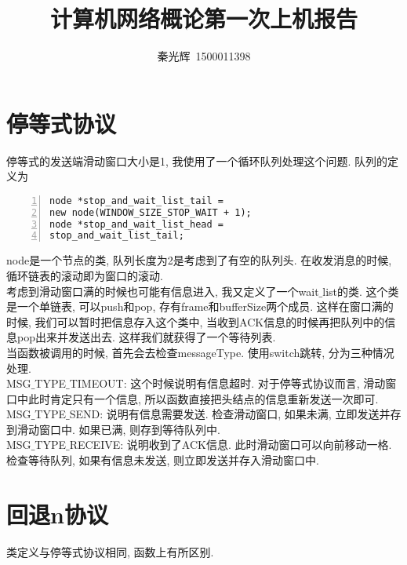 \documentclass[a4paper,12pt,notitlepage]{article}
\begin{document}
\title{计算机网络概论第一次上机报告}
\author{秦光辉\ 1500011398}
\maketitle

\section{停等式协议}

	停等式的发送端滑动窗口大小是1, 我使用了一个循环队列处理这个问题. 队列的定义为
	
\begin{lstlisting}[frame=shadowbox,numbers=left]
node *stop_and_wait_list_tail = 
new node(WINDOW_SIZE_STOP_WAIT + 1);
node *stop_and_wait_list_head = 
stop_and_wait_list_tail;
\end{lstlisting}

	node是一个节点的类, 队列长度为2是考虑到了有空的队列头. 在收发消息的时候, 循环链表的滚动即为窗口的滚动. \\
	
	考虑到滑动窗口满的时候也可能有信息进入, 我又定义了一个wait$\_$list的类. 这个类是一个单链表, 可以push和pop, 存有frame和bufferSize两个成员. 这样在窗口满的时候, 我们可以暂时把信息存入这个类中, 当收到ACK信息的时候再把队列中的信息pop出来并发送出去. 这样我们就获得了一个等待列表. \\
	
	当函数被调用的时候, 首先会去检查messageType. 使用switch跳转, 分为三种情况处理. \\
	
	MSG$\_$TYPE$\_$TIMEOUT: 这个时候说明有信息超时. 对于停等式协议而言, 滑动窗口中此时肯定只有一个信息, 所以函数直接把头结点的信息重新发送一次即可. \\
	
	MSG$\_$TYPE$\_$SEND: 说明有信息需要发送. 检查滑动窗口, 如果未满, 立即发送并存到滑动窗口中. 如果已满, 则存到等待队列中. \\
	
	MSG$\_$TYPE$\_$RECEIVE: 说明收到了ACK信息. 此时滑动窗口可以向前移动一格. 检查等待队列, 如果有信息未发送, 则立即发送并存入滑动窗口中.
	
\section{回退n协议}

	类定义与停等式协议相同, 函数上有所区别. \\
	
\end{document}
